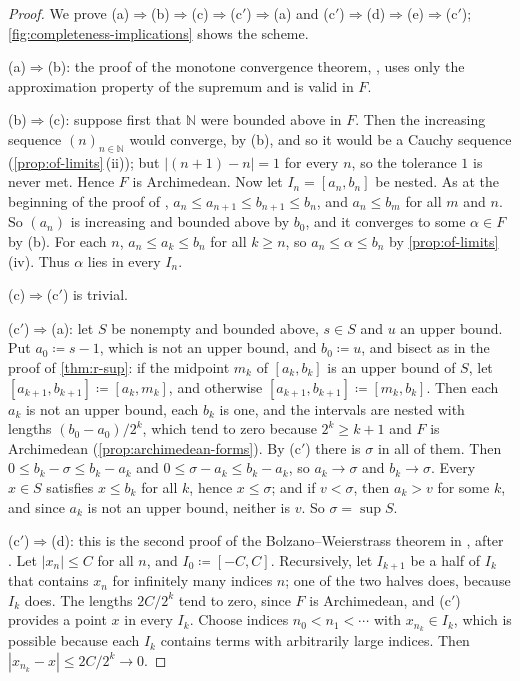 \begin{proof}
We prove (a)$\Rightarrow$(b)$\Rightarrow$(c)$\Rightarrow$(c$'$)$\Rightarrow$(a) and (c$'$)$\Rightarrow$(d)$\Rightarrow$(e)$\Rightarrow$(c$'$); \cref{fig:completeness-implications} shows the scheme.

(a)$\Rightarrow$(b): the proof of the monotone convergence theorem, , uses only the approximation property of the supremum and is valid in $F$.

(b)$\Rightarrow$(c): suppose first that $\mathbb N$ were bounded above in $F$. Then the increasing sequence $(n)_{n\in\mathbb N}$ would converge, by (b), and so it would be a Cauchy sequence (\cref{prop:of-limits}\,(ii)); but $|(n+1)-n|=1$ for every $n$, so the tolerance $1$ is never met. Hence $F$ is Archimedean. Now let $I_n=[a_n,b_n]$ be nested. As at the beginning of the proof of , $a_n\le a_{n+1}\le b_{n+1}\le b_n$, and $a_n\le b_m$ for all $m$ and $n$. So $(a_n)$ is increasing and bounded above by $b_0$, and it converges to some $\alpha\in F$ by (b). For each $n$, $a_n\le a_k\le b_n$ for all $k\ge n$, so $a_n\le\alpha\le b_n$ by \cref{prop:of-limits}\,(iv). Thus $\alpha$ lies in every $I_n$.

(c)$\Rightarrow$(c$'$) is trivial.

(c$'$)$\Rightarrow$(a): let $S$ be nonempty and bounded above, $s\in S$ and $u$ an upper bound. Put $a_0\coloneqq s-1$, which is not an upper bound, and $b_0\coloneqq u$, and bisect as in the proof of \cref{thm:r-sup}: if the midpoint $m_k$ of $[a_k,b_k]$ is an upper bound of $S$, let $[a_{k+1},b_{k+1}]\coloneqq[a_k,m_k]$, and otherwise $[a_{k+1},b_{k+1}]\coloneqq[m_k,b_k]$. Then each $a_k$ is not an upper bound, each $b_k$ is one, and the intervals are nested with lengths $(b_0-a_0)/2^k$, which tend to zero because $2^k\ge k+1$ and $F$ is Archimedean (\cref{prop:archimedean-forms}). By (c$'$) there is $\sigma$ in all of them. Then $0\le b_k-\sigma\le b_k-a_k$ and $0\le\sigma-a_k\le b_k-a_k$, so $a_k\to\sigma$ and $b_k\to\sigma$. Every $x\in S$ satisfies $x\le b_k$ for all $k$, hence $x\le\sigma$; and if $v<\sigma$, then $a_k>v$ for some $k$, and since $a_k$ is not an upper bound, neither is $v$. So $\sigma=\sup S$.

(c$'$)$\Rightarrow$(d): this is the second proof of the Bolzano--Weierstrass theorem in , after . Let $|x_n|\le C$ for all $n$, and $I_0\coloneqq[-C,C]$. Recursively, let $I_{k+1}$ be a half of $I_k$ that contains $x_n$ for infinitely many indices $n$; one of the two halves does, because $I_k$ does. The lengths $2C/2^k$ tend to zero, since $F$ is Archimedean, and (c$'$) provides a point $x$ in every $I_k$. Choose indices $n_0<n_1<\cdots$ with $x_{n_k}\in I_k$, which is possible because each $I_k$ contains terms with arbitrarily large indices. Then $|x_{n_k}-x|\le2C/2^k\to0$.


\end{proof}
